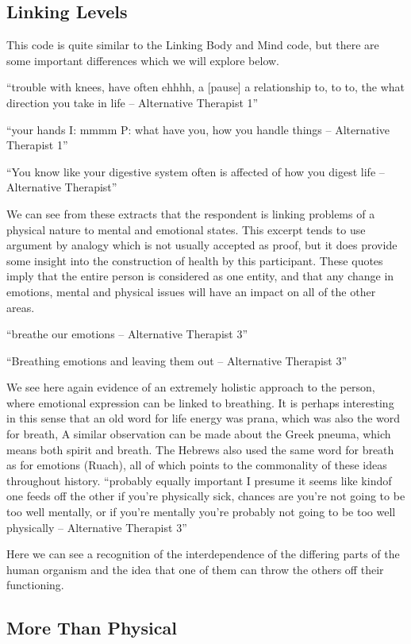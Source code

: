 \subsection{Linking Levels}

This code is quite similar to the Linking Body and Mind code, but there are some important differences which we will explore below. 

``trouble with knees, have often ehhhh, a [pause] a relationship to, to to, the what direction you take in life – Alternative Therapist 1''

``your hands 
I: mmmm
P: what have you, how you handle things – Alternative Therapist 1''

``You know like your digestive system often is affected of how you digest life – Alternative Therapist''


We can see from these extracts that the respondent is linking problems of a physical nature to mental and emotional states. This excerpt tends to use argument by analogy which is not usually accepted as proof, but it does provide some insight into the construction of health by this participant. These quotes imply that the entire person is considered as one entity, and that any change in emotions, mental and physical issues will have an impact on all of the other areas. 

``breathe our emotions – Alternative Therapist 3''

``Breathing emotions and leaving them out – Alternative Therapist 3''

We see here again evidence of an extremely holistic approach to the person, where emotional expression can be linked to breathing. It is perhaps interesting in this sense that an old word for life energy was prana, which was also the word for breath, A similar observation can be made about the Greek pneuma, which means both spirit and breath. The Hebrews also used the same word for breath as for emotions (Ruach), all of which points to the commonality of these ideas throughout history. 
``probably equally important I presume it seems like kindof one feeds off the other if you're physically sick, chances are you're not going to be too well mentally, or if you're mentally you're probably not going to be too well physically – Alternative Therapist 3''

Here we can see a recognition of the interdependence of the differing parts of the human organism and the idea that one of them can throw the others off their functioning. 

\subsection{More Than Physical}
\label{sec:more-than-physical}

